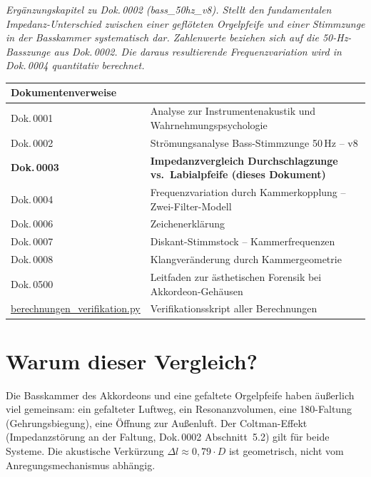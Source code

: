 \documentclass[11pt,a4paper]{article}
\begin{document}
\hbmaketitle

{\small\itshape Ergänzungskapitel zu Dok.\,0002 (bass\_50hz\_v8). Stellt den fundamentalen Impedanz-Unterschied zwischen einer geflöteten Orgelpfeife und einer Stimmzunge in der Basskammer systematisch dar. Zahlenwerte beziehen sich auf die 50-Hz-Basszunge aus Dok.\,0002. Die daraus resultierende Frequenzvariation wird in Dok.\,0004 quantitativ berechnet.}

\vspace{2mm}
\begin{center}\small
\begin{tabularx}{\textwidth}{l X}
\hbtoprule
\textbf{Dokumentenverweise} \\
\midrule
Dok.\,0001 & Analyse zur Instrumentenakustik und Wahrnehmungspsychologie \\
Dok.\,0002 & Strömungsanalyse Bass-Stimmzunge 50\,Hz -- v8 \\
\textbf{Dok.\,0003} & \textbf{Impedanzvergleich Durchschlagzunge vs.\ Labialpfeife (dieses Dokument)} \\
Dok.\,0004 & Frequenzvariation durch Kammerkopplung -- Zwei-Filter-Modell \\
Dok.\,0006 & Zeichenerklärung \\
Dok.\,0007 & Diskant-Stimmstock -- Kammerfrequenzen \\
Dok.\,0008 & Klangveränderung durch Kammergeometrie \\
Dok.\,0500 & Leitfaden zur ästhetischen Forensik bei Akkordeon-Gehäusen \\
\midrule
\href{berechnungen_verifikation.py}{berechnungen\_verifikation.py} & Verifikationsskript aller Berechnungen \\
\bottomrule
\end{tabularx}
\end{center}

\vspace{4mm}

\section{Warum dieser Vergleich?}

Die Basskammer des Akkordeons und eine gefaltete Orgelpfeife haben äußerlich viel gemeinsam: ein gefalteter Luftweg, ein Resonanzvolumen, eine 180\textdegree-Faltung (Gehrungsbiegung), eine Öffnung zur Außenluft. Der Coltman-Effekt (Impedanzstörung an der Faltung, Dok.\,0002 Abschnitt~5.2) gilt für beide Systeme. Die akustische Verkürzung $\Delta l \approx 0{,}79 \cdot D$ ist geometrisch, nicht vom Anregungsmechanismus abhängig.
\end{document}
